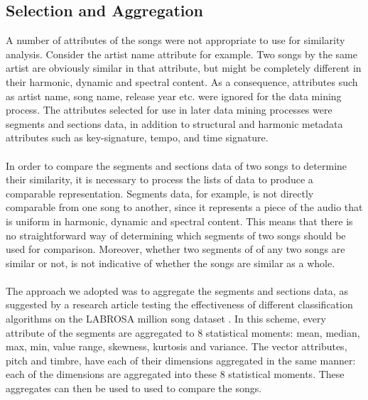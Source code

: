 \subsection{Selection and Aggregation}
\label{sec:preprocessing_selection}
A number of attributes of the songs were not appropriate to use for similarity analysis. Consider the artist name attribute for example. Two songs by the same artist are obviously similar in that attribute, but might be completely different in their harmonic, dynamic and spectral content. As a consequence, attributes such as artist name, song name, release year etc. were ignored for the data mining process. The attributes selected for use in later data mining processes were segments and sections data, in addition to structural and harmonic metadata attributes such as key-signature, tempo, and time signature.
\\\\
In order to compare the segments and sections data of two songs to determine their similarity, it is necessary to process the lists of data to produce a comparable representation. Segments data, for example, is not directly comparable from one song to another, since it represents a piece of the audio that is uniform in harmonic, dynamic and spectral content. This means that there is no straightforward way of determining which segments of two songs should be used for comparison. Moreover, whether two segments of of any two songs are similar or not, is not indicative of whether the songs are similar as a whole.
\\\\
The approach we adopted was to aggregate the segments and sections data, as suggested by a research article testing the effectiveness of different classification algorithms on the LABROSA million song dataset \citep{schindler12}. In this scheme, every attribute of the segments are aggregated to 8 statistical moments: mean, median, max, min, value range, skewness, kurtosis and variance. The vector attributes, pitch and timbre, have each of their dimensions aggregated in the same manner: each of the dimensions are aggregated into these 8 statistical moments. These aggregates can then be used to used to compare the songs.

